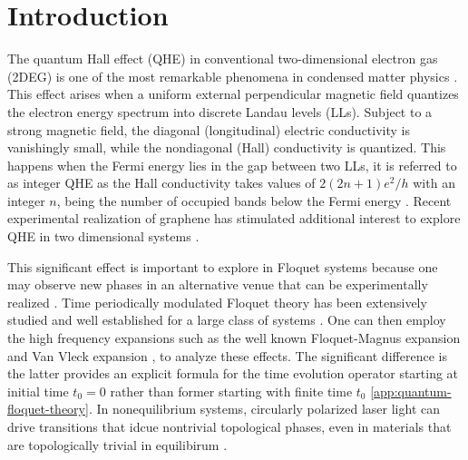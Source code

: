 \section{Introduction}

The quantum Hall effect (QHE) in conventional two-dimensional electron gas (2DEG) is one of the most remarkable phenomena in condensed matter physics \cite{QHE1}.
This effect arises when a uniform external perpendicular magnetic field quantizes the electron energy spectrum into discrete Landau levels (LLs).
Subject to a strong magnetic field, the diagonal (longitudinal) electric conductivity is vanishingly small, while the nondiagonal (Hall) conductivity is quantized.
This happens when the Fermi energy lies in the gap between two LLs, it is referred to as integer QHE as the Hall conductivity takes values of $2(2n + 1)e^2/h$ with an integer $n$, being the number of occupied bands below the Fermi energy \cite{QHE4}.
Recent experimental realization of graphene has stimulated additional interest to explore QHE in two dimensional systems \cite{QHE2, QHE3, QHE4}.

This significant effect is important to explore in Floquet systems \cite{NHL, AEE} because one may observe new phases in an alternative venue that can be experimentally realized \cite{MCR, YHW, HZJ, JWM,merboldtObservationFloquetStates2024, choiDirectObservationFloquetBloch2024}.
Time periodically modulated Floquet theory has been extensively studied and well established for a large class of systems \cite{JHS,HSA,MGP,MBL,AEE,NGJ}.
One can then employ the high frequency expansions \cite{MBL,AEE,NGJ,SRI,API,TMS,ESM,TKT,ALA} such as the well known Floquet-Magnus expansion \cite{ESM,TKT,ALA,FCA} and Van Vleck expansion \cite{MBL,AEE}, to analyze these effects.
The significant difference is the latter provides an explicit formula for the time evolution operator starting at initial time $t_{0}=0$ rather than former starting with finite time $t_{0}$ \ref{app:quantum-floquet-theory}.
In nonequilibrium systems, circularly polarized laser light can drive transitions that idcue nontrivial topological phases, even in materials that are topologically trivial in equilibirum \cite{TKO}.

